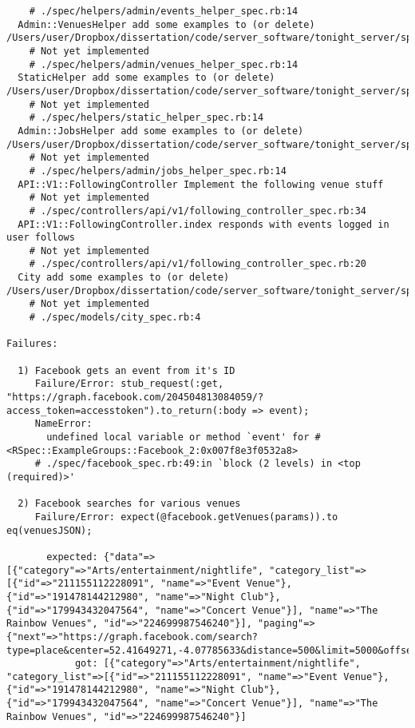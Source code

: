 \begin{lstlisting}
    # ./spec/helpers/admin/events_helper_spec.rb:14
  Admin::VenuesHelper add some examples to (or delete) /Users/user/Dropbox/dissertation/code/server_software/tonight_server/spec/helpers/admin/venues_helper_spec.rb
    # Not yet implemented
    # ./spec/helpers/admin/venues_helper_spec.rb:14
  StaticHelper add some examples to (or delete) /Users/user/Dropbox/dissertation/code/server_software/tonight_server/spec/helpers/static_helper_spec.rb
    # Not yet implemented
    # ./spec/helpers/static_helper_spec.rb:14
  Admin::JobsHelper add some examples to (or delete) /Users/user/Dropbox/dissertation/code/server_software/tonight_server/spec/helpers/admin/jobs_helper_spec.rb
    # Not yet implemented
    # ./spec/helpers/admin/jobs_helper_spec.rb:14
  API::V1::FollowingController Implement the following venue stuff
    # Not yet implemented
    # ./spec/controllers/api/v1/following_controller_spec.rb:34
  API::V1::FollowingController.index responds with events logged in user follows
    # Not yet implemented
    # ./spec/controllers/api/v1/following_controller_spec.rb:20
  City add some examples to (or delete) /Users/user/Dropbox/dissertation/code/server_software/tonight_server/spec/models/city_spec.rb
    # Not yet implemented
    # ./spec/models/city_spec.rb:4

Failures:

  1) Facebook gets an event from it's ID
     Failure/Error: stub_request(:get, "https://graph.facebook.com/204504813084059/?access_token=accesstoken").to_return(:body => event);
     NameError:
       undefined local variable or method `event' for #<RSpec::ExampleGroups::Facebook_2:0x007f8e3f0532a8>
     # ./spec/facebook_spec.rb:49:in `block (2 levels) in <top (required)>'

  2) Facebook searches for various venues
     Failure/Error: expect(@facebook.getVenues(params)).to eq(venuesJSON);
       
       expected: {"data"=>[{"category"=>"Arts/entertainment/nightlife", "category_list"=>[{"id"=>"211155112228091", "name"=>"Event Venue"}, {"id"=>"191478144212980", "name"=>"Night Club"}, {"id"=>"179943432047564", "name"=>"Concert Venue"}], "name"=>"The Rainbow Venues", "id"=>"224699987546240"}], "paging"=>{"next"=>"https://graph.facebook.com/search?type=place&center=52.41649271,-4.07785633&distance=500&limit=5000&offset=5000&__after_id=134964199922380"}}
            got: [{"category"=>"Arts/entertainment/nightlife", "category_list"=>[{"id"=>"211155112228091", "name"=>"Event Venue"}, {"id"=>"191478144212980", "name"=>"Night Club"}, {"id"=>"179943432047564", "name"=>"Concert Venue"}], "name"=>"The Rainbow Venues", "id"=>"224699987546240"}]
       

\end{lstlisting}
